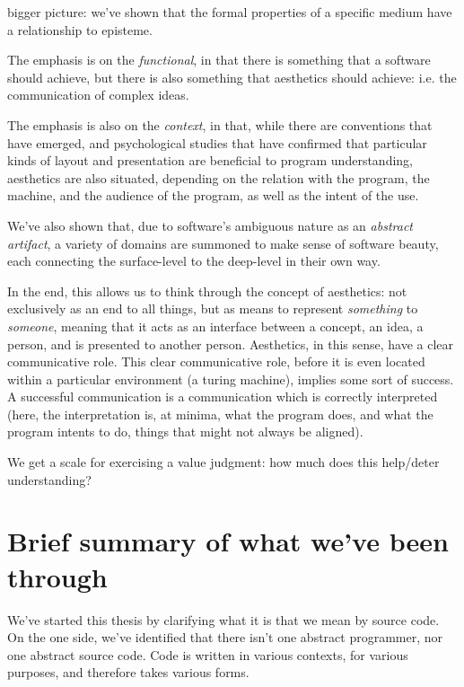 bigger picture: we've shown that the formal properties of a specific medium have a relationship to episteme.

The emphasis is on the \emph{functional}, in that there is something that a software should achieve, but there is also something that aesthetics should achieve: i.e. the communication of complex ideas.

The emphasis is also on the \emph{context}, in that, while there are conventions that have emerged, and psychological studies that have confirmed that particular kinds of layout and presentation are beneficial to program understanding, aesthetics are also situated, depending on the relation with the program, the machine, and the audience of the program, as well as the intent of the use.

We've also shown that, due to software's ambiguous nature as an \emph{abstract artifact}, a variety of domains are summoned to make sense of software beauty, each connecting the surface-level to the deep-level in their own way.

In the end, this allows us to think through the concept of aesthetics: not exclusively as an end to all things, but as means to represent \emph{something} to \emph{someone}, meaning that it acts as an interface between a concept, an idea, a person, and is presented to another person. Aesthetics, in this sense, have a clear communicative role. This clear communicative role, before it is even located within a particular environment (a turing machine), implies some sort of success. A successful communication is a communication which is correctly interpreted (here, the interpretation is, at minima, what the program does, and what the program intents to do, things that might not always be aligned).

We get a scale for exercising a value judgment: how much does this help/deter understanding?

\section{Brief summary of what we've been through}

We've started this thesis by clarifying what it is that we mean by source code. On the one side, we've identified that there isn't one abstract programmer, nor one abstract source code. Code is written in various contexts, for various purposes, and therefore takes various forms.
